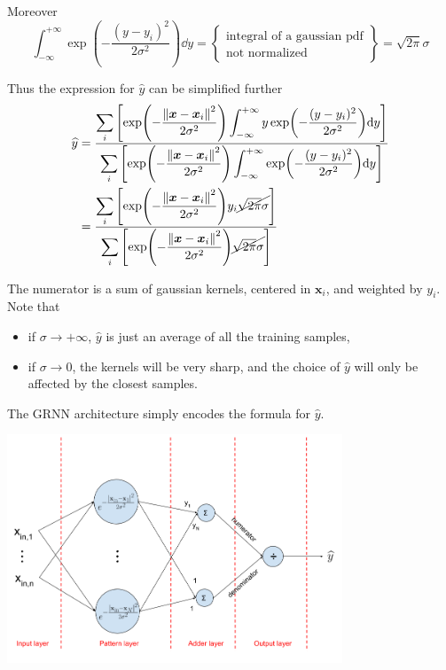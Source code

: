 \documentclass[oneside,onecolumn]{report}
\begin{document}
Moreover
$$ \int_{-\infty}^{+\infty} \exp( - \frac{(y - y_i)^2}{2 \sigma^2}) \dd y = \left\{ \substack{\text{integral of a gaussian pdf} \\ \text{not normalized}} \right\} = \sqrt{2 \pi} \sigma $$

Thus the expression for $\widehat y$ can be simplified further
\begin{align*}
    \widehat y
    &= \frac
    {\displaystyle
        \sum_i
        \left[
            \exp(- \frac{\norm{\bm x - \bm x_i}^2}{2 \sigma^2})
            \int_{-\infty}^{+\infty} y \exp( - \frac{(y - y_i)^2}{2 \sigma^2}) \dd y
        \right]
    }
    {\displaystyle
        \sum_i
        \left[
            \exp(- \frac{\norm{\bm x - \bm x_i}^2}{2 \sigma^2})
            \int_{-\infty}^{+\infty} \exp( - \frac{(y - y_i)^2}{2 \sigma^2}) \dd y
        \right]
    } \\
    &= \frac
    {\displaystyle
        \sum_i
        \left[
            \exp(- \frac{\norm{\bm x - \bm x_i}^2}{2 \sigma^2})
            y_i \cancel{\sqrt{2 \pi} \sigma}
        \right]
    }
    {\displaystyle
        \sum_i
        \left[
            \exp(- \frac{\norm{\bm x - \bm x_i}^2}{2 \sigma^2})
            \cancel{\sqrt{2 \pi} \sigma}
        \right]
    }
\end{align*}

The numerator is a sum of gaussian kernels, centered in $\bm x_i$, and weighted by $y_i$.
Note that
\begin{itemize}
    \item if $\sigma \to +\infty$, $\widehat y$ is just an average of all the training samples,
    \item if $\sigma \to 0$, the kernels will be very sharp, and the choice of $\widehat y$ will only be affected by the closest samples.
\end{itemize}

The GRNN architecture simply encodes the formula for $\widehat y$.

\begin{center}
    \includegraphics[width=10cm]{general_regression_neural_network.png}
\end{center}
\end{document}
